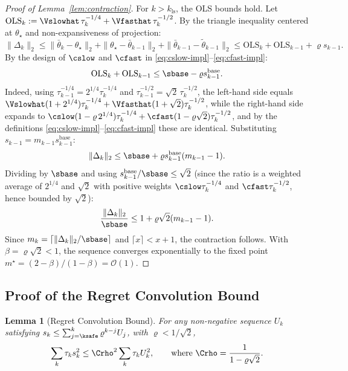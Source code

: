 \documentclass[11pt,journal,onecolumn]{IEEEtran}
\newtheorem{lemma}{Lemma}
\begin{document}
\begin{proof}[Proof of Lemma~\ref{lem:contraction}]
    For $k > k_{\mathrm{ls}}$, the OLS bounds hold. Let $\mathrm{OLS}_k := \Vslowhat\,\tau_k^{-1/4} + \Vfasthat\,\tau_k^{-1/2}$. By the triangle inequality centered at $\theta_\star$ and non-expansiveness of projection:
    \[
        \|\Delta_k\|_2 \le \|\bar\theta_k - \theta_\star\|_2 + \|\theta_\star - \bar\theta_{k-1}\|_2 + \|\bar\theta_{k-1} - \tilde\theta_{k-1}\|_2 \le \mathrm{OLS}_k + \mathrm{OLS}_{k-1} + \varrho s_{k-1}.
    \]
    By the design of $\cslow$ and $\cfast$ in \eqref{eq:cslow-impl}--\eqref{eq:cfast-impl}:
    \[
        \mathrm{OLS}_k + \mathrm{OLS}_{k-1} \le \sbase - \varrho s_{k-1}^{\mathrm{base}}.
    \]
    Indeed, using $\tau_{k-1}^{-1/4} = 2^{1/4}\tau_k^{-1/4}$ and $\tau_{k-1}^{-1/2} = \sqrt{2}\,\tau_k^{-1/2}$, the left-hand side equals $\Vslowhat(1+2^{1/4})\tau_k^{-1/4} + \Vfasthat(1+\sqrt{2})\tau_k^{-1/2}$, while the right-hand side expands to $\cslow(1-\varrho\,2^{1/4})\tau_k^{-1/4} + \cfast(1-\varrho\sqrt{2})\tau_k^{-1/2}$, and by the definitions \eqref{eq:cslow-impl}--\eqref{eq:cfast-impl} these are identical.
    Substituting $s_{k-1} = m_{k-1} s_{k-1}^{\mathrm{base}}$:
    \[
        \|\Delta_k\|_2 \le \sbase + \varrho s_{k-1}^{\mathrm{base}}(m_{k-1} - 1).
    \]
    Dividing by $\sbase$ and using $s_{k-1}^{\mathrm{base}}/\sbase \le \sqrt{2}$ (since the ratio is a weighted average of $2^{1/4}$ and $\sqrt{2}$ with positive weights $\cslow\tau_k^{-1/4}$ and $\cfast\tau_k^{-1/2}$, hence bounded by $\sqrt{2}$):
    \[
        \frac{\|\Delta_k\|_2}{\sbase} \le 1 + \varrho\sqrt{2}(m_{k-1}-1).
    \]
    Since $m_k = \lceil \|\Delta_k\|_2/\sbase \rceil$ and $\lceil x \rceil < x + 1$, the contraction follows. With $\beta = \varrho\sqrt{2} < 1$, the sequence converges exponentially to the fixed point $m^\star = (2-\beta)/(1-\beta) = \mathcal{O}(1)$.
\end{proof}

\subsection{Proof of the Regret Convolution Bound}

\begin{lemma}[Regret Convolution Bound]
    \label{lem:convolution}
    For any non-negative sequence $U_k$ satisfying $s_k \le \sum_{j=\ksafe}^k \varrho^{k-j} U_j$, with $\varrho < 1/\sqrt{2}$,
    \begin{equation}
        \sum_k \tau_k s_k^2 \le \Crho^2 \sum_k \tau_k U_k^2, \qquad \text{where } \Crho = \frac{1}{1-\varrho\sqrt{2}}.
    \end{equation}
\end{lemma}
\end{document}
